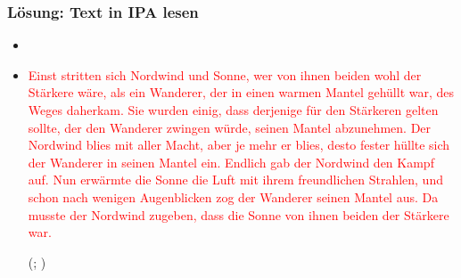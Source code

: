 
\begin{frame}
\frametitle{Lösung: Text in IPA lesen}

\begin{itemize}
	\item {\footnotesize {}}
	
	\item \textcolor{red}{\footnotesize Einst stritten sich Nordwind und Sonne, wer von ihnen beiden wohl der Stärkere wäre, als ein Wanderer, der in einen warmen Mantel gehüllt war, des Weges daherkam. Sie wurden einig, dass derjenige für den Stärkeren gelten sollte, der den Wanderer zwingen würde, seinen Mantel abzunehmen. Der Nordwind blies mit aller Macht, aber je mehr er blies, desto fester hüllte sich der Wanderer in seinen Mantel ein. Endlich gab der Nordwind den Kampf auf. Nun erwärmte die Sonne die Luft mit ihrem freundlichen Strahlen, und schon nach wenigen Augenblicken zog der Wanderer seinen Mantel aus. Da musste der Nordwind zugeben, dass die Sonne von ihnen beiden der Stärkere war.}
	
	\hfill	(\citealp{Pompino95a}; \citealp[88--89]{Kohler99a})
	
\end{itemize}

\end{frame}

